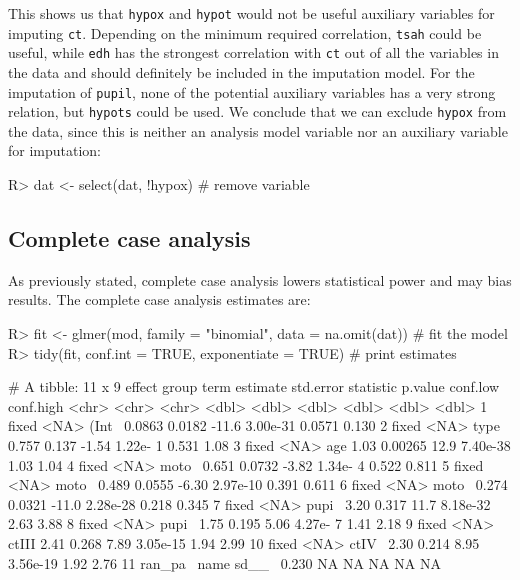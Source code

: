 \documentclass[
]{jss}
\begin{document}
This shows us that \texttt{hypox} and \texttt{hypot} would not be useful
auxiliary variables for imputing \texttt{ct}. Depending on the minimum
required correlation, \texttt{tsah} could be useful, while \texttt{edh}
has the strongest correlation with \texttt{ct} out of all the variables
in the data and should definitely be included in the imputation model.
For the imputation of \texttt{pupil}, none of the potential auxiliary
variables has a very strong relation, but \texttt{hypots} could be used.
We conclude that we can exclude \texttt{hypox} from the data, since this
is neither an analysis model variable nor an auxiliary variable for
imputation:

\begin{CodeChunk}
\begin{CodeInput}
R> dat <- select(dat, !hypox)  # remove variable
\end{CodeInput}
\end{CodeChunk}

\hypertarget{complete-case-analysis}{%
\subsection{Complete case analysis}\label{complete-case-analysis}}

As previously stated, complete case analysis lowers statistical power
and may bias results. The complete case analysis estimates are:

\begin{CodeChunk}
\begin{CodeInput}
R> fit <- glmer(mod, family = "binomial", data = na.omit(dat)) # fit the model
R> tidy(fit, conf.int = TRUE, exponentiate = TRUE)             # print estimates
\end{CodeInput}
\begin{CodeOutput}
# A tibble: 11 x 9
   effect  group term  estimate std.error statistic   p.value conf.low conf.high
   <chr>   <chr> <chr>    <dbl>     <dbl>     <dbl>     <dbl>    <dbl>     <dbl>
 1 fixed   <NA>  (Int~   0.0863   0.0182     -11.6   3.00e-31   0.0571     0.130
 2 fixed   <NA>  type~   0.757    0.137       -1.54  1.22e- 1   0.531      1.08 
 3 fixed   <NA>  age     1.03     0.00265     12.9   7.40e-38   1.03       1.04 
 4 fixed   <NA>  moto~   0.651    0.0732      -3.82  1.34e- 4   0.522      0.811
 5 fixed   <NA>  moto~   0.489    0.0555      -6.30  2.97e-10   0.391      0.611
 6 fixed   <NA>  moto~   0.274    0.0321     -11.0   2.28e-28   0.218      0.345
 7 fixed   <NA>  pupi~   3.20     0.317       11.7   8.18e-32   2.63       3.88 
 8 fixed   <NA>  pupi~   1.75     0.195        5.06  4.27e- 7   1.41       2.18 
 9 fixed   <NA>  ctIII   2.41     0.268        7.89  3.05e-15   1.94       2.99 
10 fixed   <NA>  ctIV~   2.30     0.214        8.95  3.56e-19   1.92       2.76 
11 ran_pa~ name  sd__~   0.230   NA           NA    NA         NA         NA    
\end{CodeOutput}
\end{CodeChunk}
\end{document}
